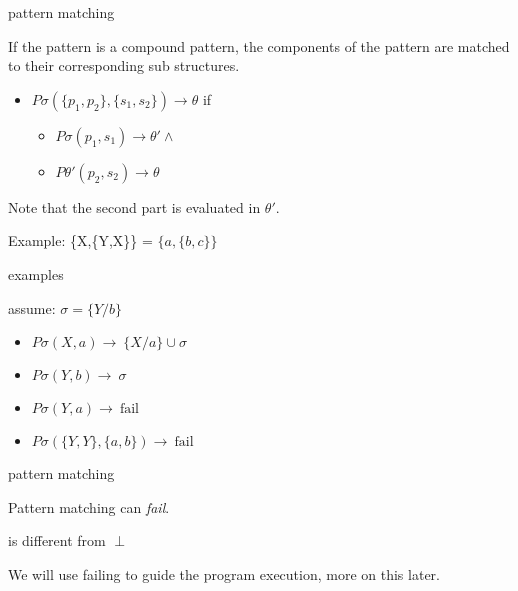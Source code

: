 \begin{frame}{pattern matching}

If the pattern is a compound pattern, \pause the components of the pattern are matched to their corresponding sub structures.

\pause

 \begin{itemize}
   \pause \item $P\sigma(\lbrace p_1, p_2 \rbrace , \lbrace s_1, s_2 \rbrace) \rightarrow \theta$ if
   \begin{itemize}
     \pause \item  $P\sigma(p_1 , s_1) \rightarrow \theta' \wedge$
     \pause \item  $P\theta'(p_2 , s_2) \rightarrow \theta$
   \end{itemize}
 \end{itemize}

\pause \vspace{10pt}
Note that the second part is evaluated in $\theta'$. 

\pause \vspace{10pt}Example: \{X,\{Y,X\}\} = $\{a, \{b,c\}\}$

\vspace{20pt}{\em Match a compund pattern with anyting but a compound structure will fail.}

\end{frame}

\begin{frame}{examples}

assume: $\sigma = \lbrace Y/b\rbrace$

\begin{itemize}
  \pause\item $P\sigma(X , a) \rightarrow $\pause $\ \lbrace X/a \rbrace  \cup \sigma$
  \pause\item $P\sigma(Y , b) \rightarrow $\pause $\ \sigma$
  \pause\item $P\sigma(Y , a) \rightarrow $\pause  $\ \mathrm{fail}$
  \pause\item $P\sigma(\lbrace Y, Y\rbrace , \lbrace a, b \rbrace) \rightarrow $\pause $\ \mathrm{fail}$
\end{itemize}

\end{frame}

\begin{frame}{pattern matching}

\pause Pattern matching can {\em fail}. 

\pause\vspace{20pt}{\em fail} is different from $\perp$

We will use failing to guide the program execution, more on this later.

\end{frame}

